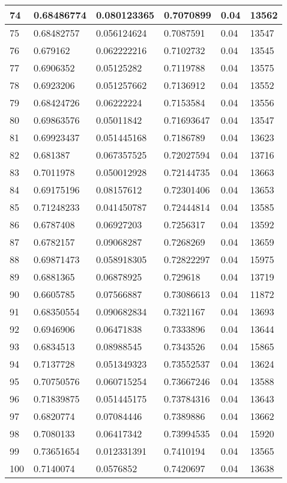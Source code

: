 \begin{longtable}{|l|l|l|l|l|l|}
74 & 0.68486774 & 0.080123365 & 0.7070899 & 0.04 & 13562 \\ \hline 
75 & 0.68482757 & 0.056124624 & 0.7087591 & 0.04 & 13547 \\ \hline 
76 & 0.679162 & 0.062222216 & 0.7102732 & 0.04 & 13545 \\ \hline 
77 & 0.6906352 & 0.05125282 & 0.7119788 & 0.04 & 13575 \\ \hline 
78 & 0.6923206 & 0.051257662 & 0.7136912 & 0.04 & 13552 \\ \hline 
79 & 0.68424726 & 0.06222224 & 0.7153584 & 0.04 & 13556 \\ \hline 
80 & 0.69863576 & 0.05011842 & 0.71693647 & 0.04 & 13547 \\ \hline 
81 & 0.69923437 & 0.051445168 & 0.7186789 & 0.04 & 13623 \\ \hline 
82 & 0.681387 & 0.067357525 & 0.72027594 & 0.04 & 13716 \\ \hline 
83 & 0.7011978 & 0.050012928 & 0.72144735 & 0.04 & 13663 \\ \hline 
84 & 0.69175196 & 0.08157612 & 0.72301406 & 0.04 & 13653 \\ \hline 
85 & 0.71248233 & 0.041450787 & 0.72444814 & 0.04 & 13585 \\ \hline 
86 & 0.6787408 & 0.06927203 & 0.7256317 & 0.04 & 13592 \\ \hline 
87 & 0.6782157 & 0.09068287 & 0.7268269 & 0.04 & 13659 \\ \hline 
88 & 0.69871473 & 0.058918305 & 0.72822297 & 0.04 & 15975 \\ \hline 
89 & 0.6881365 & 0.06878925 & 0.729618 & 0.04 & 13719 \\ \hline 
90 & 0.6605785 & 0.07566887 & 0.73086613 & 0.04 & 11872 \\ \hline 
91 & 0.68350554 & 0.090682834 & 0.7321167 & 0.04 & 13693 \\ \hline 
92 & 0.6946906 & 0.06471838 & 0.7333896 & 0.04 & 13644 \\ \hline 
93 & 0.6834513 & 0.08988545 & 0.7343526 & 0.04 & 15865 \\ \hline 
94 & 0.7137728 & 0.051349323 & 0.73552537 & 0.04 & 13624 \\ \hline 
95 & 0.70750576 & 0.060715254 & 0.73667246 & 0.04 & 13588 \\ \hline 
96 & 0.71839875 & 0.051445175 & 0.73784316 & 0.04 & 13643 \\ \hline 
97 & 0.6820774 & 0.07084446 & 0.7389886 & 0.04 & 13662 \\ \hline 
98 & 0.7080133 & 0.06417342 & 0.73994535 & 0.04 & 15920 \\ \hline 
99 & 0.73651654 & 0.012331391 & 0.7410194 & 0.04 & 13565 \\ \hline 
100 & 0.7140074 & 0.0576852 & 0.7420697 & 0.04 & 13638 \\ \hline 
\end{longtable}
